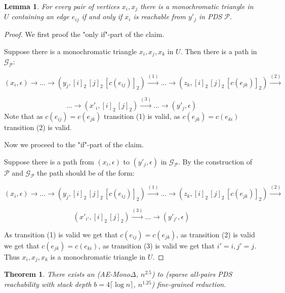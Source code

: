 \documentclass[12pt]{article}
\newtheorem{theorem}{Theorem}[section]
\newtheorem{lemma}{Lemma}[section]
\begin{document}
\begin{lemma}
For every pair of vertices $x_i, x_j$ there is a monochromatic triangle in $U$ containing an edge $e_{ij}$ if and only if $x_i$ is reachable from $y'_j$ in PDS $\mathcal{P}$.
\end{lemma}

\begin{proof}
We first proof the "only if"-part of the claim. 

Suppose there is a monochromatic triangle $x_i, x_j, x_k$ in $U$. Then there is a path in $\mathcal{G}_{\mathcal{P}}$:

$$(x_i, \epsilon) \rightarrow \ldots \rightarrow 
(y_j, [i]_2 \, [j]_2 \, [c(e_{ij})]_2) \xrightarrow{(1)} \ldots \rightarrow 
(z_k, [i]_2 \, [j]_2 \, [c(e_{jk})]_2) \xrightarrow{(2)} $$

$$\ldots \rightarrow 
(x'_i, [i]_2 \, [j]_2) \xrightarrow{(3)} \ldots \rightarrow 
(y'_j, \epsilon)$$
Note that as $c(e_{ij}) = c(e_{jk})$ transition (1) is valid, as $c(e_{jk}) = c(e_{ki})$ transition (2) is valid.

Now we proceed to the "if"-part of the claim.

Suppose there is a path from $(x_i, \epsilon)$ to $(y'_j, \epsilon)$ in $\mathcal{G}_{\mathcal{P}}$. By the construction of $\mathcal{P}$ and $\mathcal{G}_{\mathcal{P}}$ the path should be of the form:

$$(x_i, \epsilon) \rightarrow \ldots \rightarrow 
(y_j, [i]_2 \, [j]_2 \, [c(e_{ij})]_2) \xrightarrow{(1)} \ldots \rightarrow 
(z_k, [i]_2 \, [j]_2 \, [c(e_{jk})]_2) \xrightarrow{(2)} $$

$$(x'_{i'}, [i]_2 \, [j]_2) \xrightarrow{(3)} \ldots \rightarrow 
(y'_{j'}, \epsilon)$$

As transition (1) is valid we get that $c(e_{ij}) = c(e_{jk})$, as transition (2) is valid we get that $c(e_{jk}) = c(e_{ki})$, as transition (3) is valid we get that $i' = i, j' = j$. Thus $x_i, x_j, x_k$ is a monochromatic triangle in $U$.
\end{proof}

\begin{theorem}
There exists an (AE-Mono$\Delta$, $n^{2.5}$) to (sparse all-pairs PDS reachability with stack depth $b = 4 \lceil \log n \rceil$, $n^{1.25}$) fine-grained reduction. 
\end{theorem}
\end{document}
